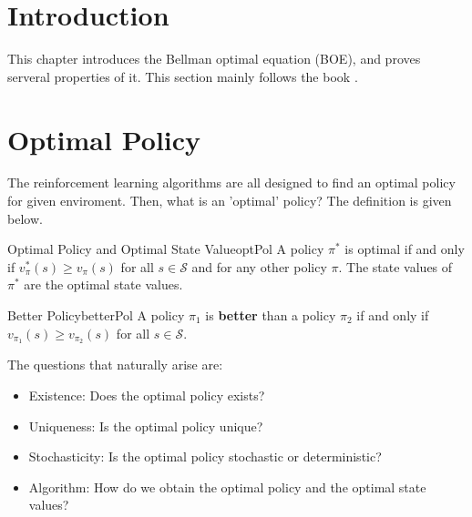 \section{Introduction}
    This chapter introduces the Bellman optimal equation (BOE), and proves serveral
    properties of it. This section mainly follows the book \cite{Zhao2025}.
\section{Optimal Policy}
    The reinforcement learning algorithms are all designed to find an optimal policy for
    given enviroment. Then, what is an 'optimal' policy? The definition is given below.
    \begin{defn}{Optimal Policy and Optimal State Value}{optPol}
        A policy $\pi^*$ is optimal if and only if $v_\pi^*(s) \geq v_\pi(s)$ for all $s \in \mathcal{S}$
        and for any other policy $\pi$. The state values of $\pi^*$ are the optimal state values.
    \end{defn}
    \begin{defn}{Better Policy}{betterPol}
        A policy $\pi_1$ is \textbf{better} than a policy $\pi_2$ if and only if
        $v_{\pi_1}(s) \geq v_{\pi_2}(s)$ for all $s \in \mathcal{S}$.
    \end{defn}
    The questions that naturally arise are:
    \begin{itemize}
        \item Existence: Does the optimal policy exists?
        \item Uniqueness: Is the optimal policy unique?
        \item Stochasticity: Is the optimal policy stochastic or deterministic?
        \item Algorithm: How do we obtain the optimal policy and the optimal state values?
    \end{itemize}
